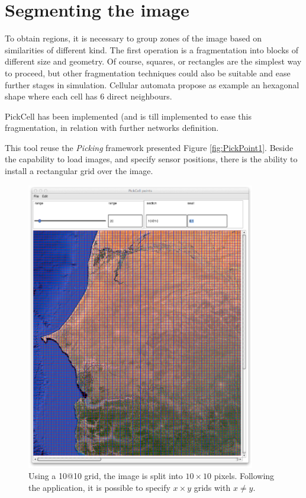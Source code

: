 \section { Segmenting the image}

To obtain regions, it is necessary to group zones of the image based on similarities of different kind.
The first operation is a fragmentation into blocks of different size and geometry. Of course,
squares, or rectangles are the simplest way to proceed, but other fragmentation techniques could also
be suitable and ease further stages in simulation. Cellular automata propose as example  an hexagonal
shape where each cell has 6 direct neighbours.

{\sc PickCell} has been implemented (and is till implemented to ease this fragmentation, in relation with 
further networks definition.

This tool reuse the {\sl Picking} framework presented Figure  \ref{fig:PickPoint1}. Beside the capability
to load images, and specify sensor positions, there is the ability to install a rectangular grid over the
image.


\begin{figure}[hbtp]
\begin{center} 
\includegraphics[width=10cm]{SenegalGrid10x10.png}
\caption{Using a 10@10 grid, the image is split into $10\times10$ pixels. 
Following the application, it is possible to specify $x  \times   y$ grids with $x  \neq  y$.}
\label{fig:SenegalGrid10x10}
\end{center}
\end{figure}

